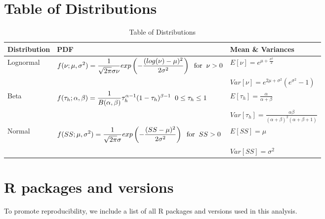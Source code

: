 \documentclass[oneside,12pt,final]{sty/ucthesis-CA2012}
\begin{document}
\begin{mainmatter}
\section{Table of Distributions}
\begin{table}
\caption{Table of Distributions}
\begin{tabular}{l|l|l}
  \hline \small
 Distribution & PDF & Mean \& Variances \\ 
   \hline
   Lognormal & \(\displaystyle f(\nu;\mu,\sigma^2) = \frac{1}{\sqrt{2\pi}\sigma \nu}exp\left( -\frac{(log(\nu)-\mu)^2}{2\sigma^2} \right) \hspace{2mm} \text{for} \hspace{2mm} \nu > 0 \) & \(\displaystyle E[\nu] = e^{\mu + \frac{\sigma^2}{2}} \) \\
      & &  \(\displaystyle Var[\nu] =  e^{2\mu + \sigma^2}(e^{\sigma^2} - 1) \) \\
   \hline
   Beta & \(\displaystyle f(\tau_{h};\alpha,\beta) = \frac{1}{B(\alpha, \beta)} \tau_{h}^{\alpha -1} (1-\tau_{h})^{\beta -1}  \hspace{2mm} 0 \leq \tau_{h} \leq 1   \) &  \(\displaystyle E[\tau_{h}] = \frac{\alpha}{\alpha + \beta} \) \\
	   & &  \(\displaystyle Var[{\tau_{h}}] = \frac{\alpha\beta}{(\alpha + \beta)^2(\alpha + \beta + 1)} \) \\  	
   \hline
      Normal &  \(\displaystyle f(SS;\mu,\sigma^2) = \frac{1}{\sqrt{2\pi}\sigma }exp\left( -\frac{(SS-\mu)^2}{2\sigma^2} \right) \hspace{2mm} \text{for} \hspace{2mm} SS > 0 \) & \(\displaystyle E[SS] =\mu \) \\
      & &  \(\displaystyle Var[SS] =  \sigma^2 \) \\
\end{tabular} 
\label{distributions_a3}
\end{table}

\newpage

\section{R packages and versions}
To promote reproducibility, we include a list of all R packages and versions used in this analysis.


\end{mainmatter}
\end{document}
